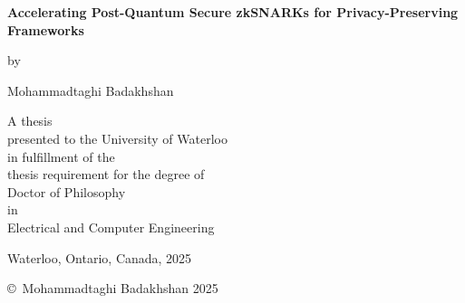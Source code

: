 \pagestyle{empty}

\begin{titlepage}
        \begin{center}
        \vspace*{1.0cm}

        \Huge
        {\bf Accelerating Post-Quantum Secure zkSNARKs for Privacy-Preserving Frameworks}


        \vspace*{1.0cm}

        \normalsize
        by \\

        \vspace*{1.0cm}

        \Large
        Mohammadtaghi Badakhshan \\

        \vspace*{2.5cm}

        \normalsize
        A thesis \\
        presented to the University of Waterloo \\ 
        in fulfillment of the \\
        thesis requirement for the degree of \\
        Doctor of Philosophy \\
        in \\
        Electrical and Computer Engineering \\

        \vspace*{1.5cm}

        Waterloo, Ontario, Canada, 2025 \\

        \vspace*{1.0cm}

        \copyright\ Mohammadtaghi Badakhshan 2025 \\
        \end{center}
\end{titlepage}

